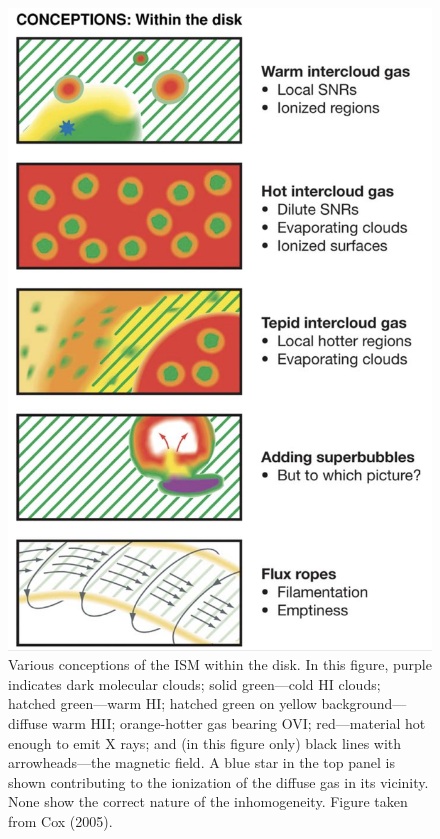 \documentclass[a4paper,10pt]{article}
\begin{document}
\begin{figure}[t!]
    \centering
    \includegraphics[width=15cm]{figures/ISM_disk.png}
    \caption{\footnotesize{Various conceptions of the ISM within the disk. In this figure, purple indicates dark molecular clouds; solid green—cold HI clouds; hatched green—warm HI; hatched green on yellow background—diffuse warm HII; orange-hotter gas bearing OVI; red—material hot enough to emit X rays; and (in this figure only) black lines with arrowheads—the magnetic field. A blue star in the top panel is shown contributing to the ionization of the diffuse gas in its vicinity. None show the correct nature of the inhomogeneity. Figure taken from Cox (2005).}}
    \label{fig:ISMdisk}
\end{figure}
\end{document}
